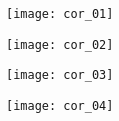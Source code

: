 \ifprof
 
\begin{center}
\texttt{[image: cor\_01]}
\end{center}

\begin{center}
\texttt{[image: cor\_02]}
\end{center}

\begin{center}
\texttt{[image: cor\_03]}
\end{center}

\begin{center}
\texttt{[image: cor\_04]}
\end{center}

\else
\fi
